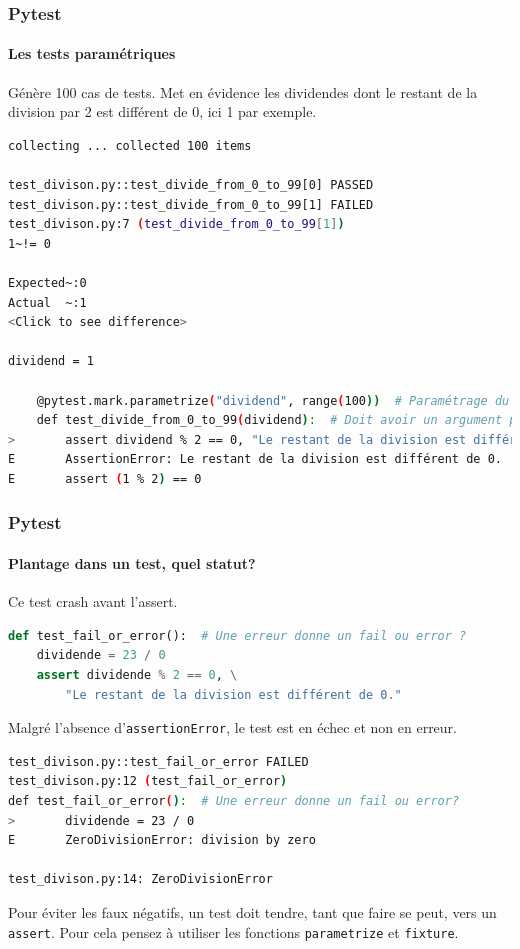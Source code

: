 \documentclass{beamer}
\begin{document}
    \begin{frame}[fragile]
        \frametitle{Pytest}
        \framesubtitle{Les tests paramétriques}
        \transdissolve
        Génère 100 cas de tests.
        Met en évidence les dividendes dont le restant de la division par 2 est différent de 0, ici 1 par exemple.
        \begin{lstlisting}[language=sh]
collecting ... collected 100 items

test_divison.py::test_divide_from_0_to_99[0] PASSED                      [  1%]
test_divison.py::test_divide_from_0_to_99[1] FAILED                      [  2%]
test_divison.py:7 (test_divide_from_0_to_99[1])
1~!= 0

Expected~:0
Actual  ~:1
<Click to see difference>

dividend = 1

    @pytest.mark.parametrize("dividend", range(100))  # Paramétrage du test
    def test_divide_from_0_to_99(dividend):  # Doit avoir un argument présent dans le paramétrage
>       assert dividend % 2 == 0, "Le restant de la division est différent de 0."
E       AssertionError: Le restant de la division est différent de 0.
E       assert (1 % 2) == 0
        \end{lstlisting}
    \end{frame}

    \begin{frame}[fragile]
        \frametitle{Pytest}
        \framesubtitle{Plantage dans un test, quel statut?}
        \transdissolve
        Ce test crash avant l'assert.
        \begin{lstlisting}[language=Python]
def test_fail_or_error():  # Une erreur donne un fail ou error ?
    dividende = 23 / 0
    assert dividende % 2 == 0, \
        "Le restant de la division est différent de 0."
        \end{lstlisting}
        Malgré l'absence d'\lstinline{assertionError}, le test est en échec et non en erreur.
        \begin{lstlisting}[language=sh]
test_divison.py::test_fail_or_error FAILED                               [100%]
test_divison.py:12 (test_fail_or_error)
def test_fail_or_error():  # Une erreur donne un fail ou error?
>       dividende = 23 / 0
E       ZeroDivisionError: division by zero

test_divison.py:14: ZeroDivisionError
        \end{lstlisting}

        \begin{dangercolorbox}
            Pour éviter les faux négatifs, un test doit tendre, tant que faire se peut, vers un \lstinline{assert}.
            Pour cela pensez à utiliser les fonctions \lstinline{parametrize} et \lstinline{fixture}.
        \end{dangercolorbox}
    \end{frame}
\end{document}
